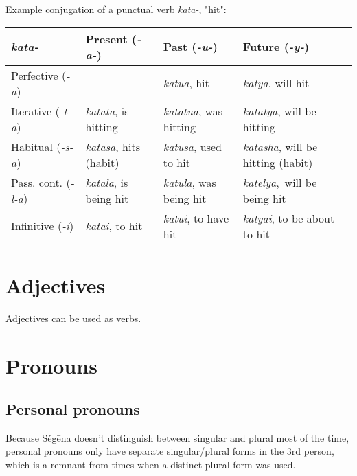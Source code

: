 Example conjugation of a punctual verb \emph{kata-}, "hit":

\begin{table}[H]
\begin{tabular}{ l|l|l|l }
	\emph{kata-}              & Present (\emph{-a-})          & Past (\emph{-u-})              & Future (\emph{-y-})                     \\
	\hline
	Perfective (\emph{-a})    & —                             & \emph{katua}, hit              & \emph{katya}, will hit                  \\
	Iterative (\emph{-t-a})   & \emph{katata}, is hitting     & \emph{katatua}, was hitting    & \emph{katatya}, will be hitting         \\
	Habitual (\emph{-s-a})    & \emph{katasa}, hits (habit)   & \emph{katusa}, used to hit     & \emph{katasha}, will be hitting (habit) \\
	Pass. cont. (\emph{-l-a}) & \emph{katala}, is being hit   & \emph{katula}, was being hit   & \emph{katelya}, will be being hit       \\
	Infinitive (\emph{-i})    & \emph{katai}, to hit          & \emph{katui}, to have hit      & \emph{katyai}, to be about to hit       \\
\end{tabular}
\end{table}

\section{Adjectives}

Adjectives can be used as verbs.

\section{Pronouns}

\subsection{Personal pronouns}

Because Ségēna doesn't distinguish between singular and plural most of the time,
personal pronouns only have separate singular/plural forms in the 3rd person,
which is a remnant from times when a distinct plural form was used.

